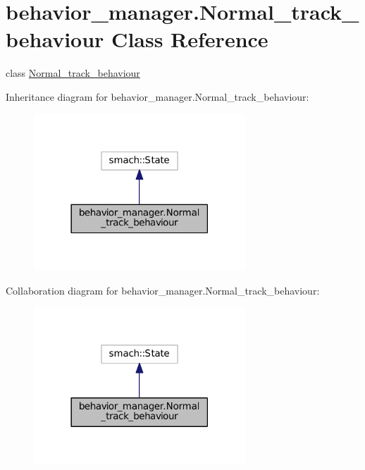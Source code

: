 \hypertarget{classbehavior__manager_1_1Normal__track__behaviour}{}\section{behavior\+\_\+manager.\+Normal\+\_\+track\+\_\+behaviour Class Reference}
\label{classbehavior__manager_1_1Normal__track__behaviour}


class \hyperlink{classbehavior__manager_1_1Normal__track__behaviour}{Normal\+\_\+track\+\_\+behaviour}  




Inheritance diagram for behavior\+\_\+manager.\+Normal\+\_\+track\+\_\+behaviour\+:
\nopagebreak
\begin{figure}[H]
\begin{center}
\leavevmode
\includegraphics[width=225pt]{classbehavior__manager_1_1Normal__track__behaviour__inherit__graph}
\end{center}
\end{figure}


Collaboration diagram for behavior\+\_\+manager.\+Normal\+\_\+track\+\_\+behaviour\+:
\nopagebreak
\begin{figure}[H]
\begin{center}
\leavevmode
\includegraphics[width=225pt]{classbehavior__manager_1_1Normal__track__behaviour__coll__graph}
\end{center}
\end{figure}
